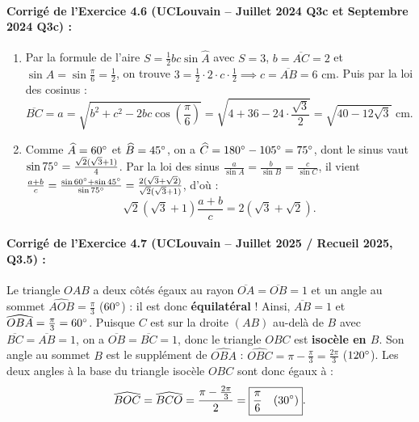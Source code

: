 \paragraph{Corrigé de l'Exercice 4.6 (UCLouvain -- Juillet 2024 Q3c et Septembre 2024 Q3c) :}
\begin{enumerate}[label=(\alph*)]
    \item Par la formule de l'aire $S = \frac{1}{2}bc\sin\widehat{A}$ avec $S = 3$, $b = \overline{AC} = 2$ et $\sin\widehat{A} = \sin\frac{\pi}{6} = \frac{1}{2}$, on trouve $3 = \frac{1}{2}\cdot 2 \cdot c \cdot \frac{1}{2} \implies c = \overline{AB} = 6\text{ cm}$. Puis par la loi des cosinus :
    \[
        \overline{BC} = a = \sqrt{b^2 + c^2 - 2bc\cos\left(\frac{\pi}{6}\right)} = \sqrt{4 + 36 - 24\cdot\frac{\sqrt{3}}{2}} = \boxed{\sqrt{40 - 12\sqrt{3}}\text{ cm}}.
    \]
    \item Comme $\widehat{A} = 60\degree$ et $\widehat{B} = 45\degree$, on a $\widehat{C} = 180\degree - 105\degree = 75\degree$, dont le sinus vaut $\sin 75\degree = \frac{\sqrt{2}(\sqrt{3}+1)}{4}$. Par la loi des sinus $\frac{a}{\sin A} = \frac{b}{\sin B} = \frac{c}{\sin C}$, il vient $\frac{a+b}{c} = \frac{\sin 60\degree + \sin 45\degree}{\sin 75\degree} = \frac{2(\sqrt{3}+\sqrt{2})}{\sqrt{2}(\sqrt{3}+1)}$, d'où :
    \[
        \sqrt{2}(\sqrt{3}+1)\frac{a+b}{c} = \boxed{2(\sqrt{3}+\sqrt{2})}.
    \]
\end{enumerate}

\paragraph{Corrigé de l'Exercice 4.7 (UCLouvain -- Juillet 2025 / Recueil 2025, Q3.5) :}
Le triangle $OAB$ a deux côtés égaux au rayon $\overline{OA} = \overline{OB} = 1$ et un angle au sommet $\widehat{AOB} = \frac{\pi}{3}$ ($60\degree$) : il est donc \textbf{équilatéral} ! Ainsi, $\overline{AB} = 1$ et $\widehat{OBA} = \frac{\pi}{3} = 60\degree$.
Puisque $C$ est sur la droite $(AB)$ au-delà de $B$ avec $\overline{BC} = \overline{AB} = 1$, on a $\overline{OB} = \overline{BC} = 1$, donc le triangle $OBC$ est \textbf{isocèle en $B$}. Son angle au sommet $B$ est le supplément de $\widehat{OBA}$ : $\widehat{OBC} = \pi - \frac{\pi}{3} = \frac{2\pi}{3}$ ($120\degree$). Les deux angles à la base du triangle isocèle $OBC$ sont donc égaux à :
\[
    \widehat{BOC} = \widehat{BCO} = \frac{\pi - \frac{2\pi}{3}}{2} = \boxed{\frac{\pi}{6} \quad (30\degree)}.
\]

